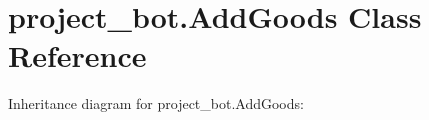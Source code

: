 \hypertarget{classproject__bot_1_1_add_goods}{}\section{project\+\_\+bot.\+Add\+Goods Class Reference}
\label{classproject__bot_1_1_add_goods}


Inheritance diagram for project\+\_\+bot.\+Add\+Goods\+:
